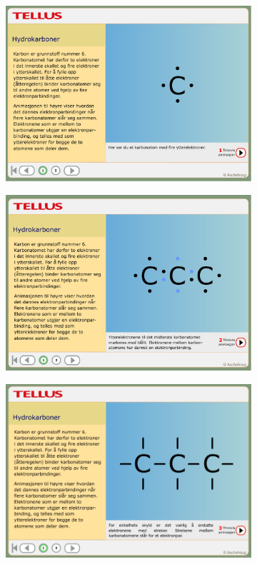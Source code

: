 \documentclass[main.tex]{subfiles}
\begin{document}
\begin{figure}[h!]
\centering
\begin{subfigure}{.5\textwidth}
  \centering
  \includegraphics[scale = 0.20]{../figures/lokus1.png}
\end{subfigure}%
\begin{subfigure}{.5\textwidth}
  \centering
  \includegraphics[scale = 0.199]{../figures/lokus2.png}
\end{subfigure}
\begin{subfigure}{.5\textwidth}
  \centering
  \includegraphics[scale = 0.34]{../figures/lokus3.png}

\end{subfigure}
\end{figure}
\end{document}
